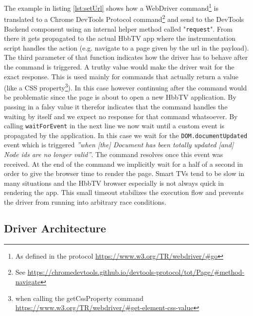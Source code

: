 The example in listing \ref{lst:setUrl} shows how a WebDriver command\footnote{As defined in the protocol
\url{https://www.w3.org/TR/webdriver/\#go}} is translated to a Chrome DevTools Protocol command\footnote{See
\url{https://chromedevtools.github.io/devtools-protocol/tot/Page/\#method-navigate}} and send to the DevTools
Backend component using an internal helper method called "\texttt{request}". From there it gets propagated
to the actual HbbTV app where the instrumentation script handles the action (e.g. navigate to a page given
by the url in the payload). The third parameter of that function indicates how the driver has to behave after
the command is triggered. A truthy value would make the driver wait for the exact response. This is used
mainly for commands that actually return a value (like a CSS property\footnote{when calling the getCssProperty
command \url{https://www.w3.org/TR/webdriver/\#get-element-css-value}}). In this case however continuing after
the command would be problematic since the page is about to open a new HbbTV application. By passing in a falsy
value it therefor indicates that the command handles the waiting by itself and we expect no response for that
command whatsoever. By calling \texttt{waitForEvent} in the next line we now wait until a custom event is
propagated by the application. In this case we wait for the \texttt{DOM.documentUpdated} event which is triggered
\textit{''when [the] Document has been totally updated [and] Node ids are no longer valid''}\cite{devtoolsprotocolDOM}.
The command resolves once this event was received. At the end of the command we implicitly wait for a half of
a second in order to give the browser time to render the page. Smart TVs tend to be slow in many situations and
the HbbTV browser especially is not always quick in rendering the app. This small timeout stabilizes the
execution flow and prevents the driver from running into arbitrary race conditions.

\subsection{Driver Architecture\label{sec:implDriver}}

